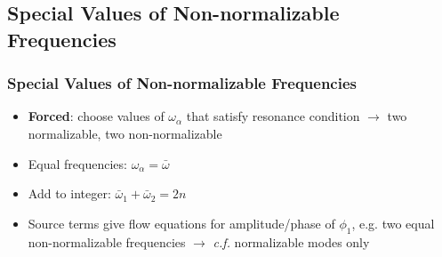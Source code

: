 \documentclass[mathserif,10pt]{beamer}
\newcommand{\bi}{\begin{itemize}}
\newcommand{\ei}{\end{itemize}}
\newcommand{\its}{\item}
\begin{document}
{%

\subsection{Special Values of Non-normalizable Frequencies}
\frame
{
  \frametitle{Special Values of Non-normalizable Frequencies}
  \bi
  \its<1->{{\bf Forced}: choose values of $\omega_\alpha$ that satisfy resonance condition $\to$ two normalizable, two non-normalizable}
  \its<2->{\alert<2>{Equal frequencies}: $\omega_\alpha = \bar\omega$}
  \its<3->{\alert<3>{Add to integer}: $\bar\omega_1 + \bar\omega_2 = 2n$}
  \its<4->{Source terms give flow equations for amplitude/phase of $\phi_1$, e.g. two equal non-normalizable frequencies $\to$ {\it c.f.} normalizable modes only}
  \ei

}}
\end{document}
